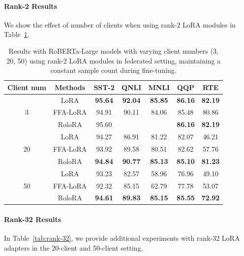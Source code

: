 \documentclass{article}
\theoremstyle{plain}
\theoremstyle{definition}
\theoremstyle{remark}
\begin{document}
\paragraph{Rank-2 Results}
We show the effect of number of clients when using rank-2 LoRA modules in Table~\ref{tab:Clients-num-appendix-rank-2}.
\begin{table}[h!]
\centering
    {\small\begin{tabular}{ccccccc}
    \toprule
        Client num& Methods  & SST-2 & QNLI & MNLI & QQP & RTE \\
        \midrule 
         &LoRA&\textbf{95.64}&\textbf{92.04}&\textbf{85.85}&\textbf{86.16}&\textbf{82.19}\\      
        3 &FFA-LoRA&94.91&90.11&84.06&85.48&80.86\\
         &\cellcolor{ours}RoloRA&\cellcolor{ours}95.60&\cellcolor{ours}{91.62}&\cellcolor{ours}{85.66}&\cellcolor{ours}\textbf{86.16}&\cellcolor{ours}\textbf{82.19}\\
         \midrule 
                 &LoRA&94.27&86.91&81.22&82.07&46.21\\
       20 &FFA-LoRA&93.92&89.58&80.51&82.62&57.76\\
         &\cellcolor{ours}RoloRA&\cellcolor{ours}\textbf{94.84}&\cellcolor{ours}\textbf{90.77}&\cellcolor{ours}\textbf{85.13}&\cellcolor{ours}\textbf{85.10}&\cellcolor{ours}\textbf{81.23}\\
         \midrule 
                 &LoRA&93.23&82.57&58.96&76.96&49.10\\
        50 &FFA-LoRA&92.32&85.15&62.79&77.78&53.07\\
         &\cellcolor{ours}RoloRA&\cellcolor{ours}\textbf{94.61}&\cellcolor{ours}\textbf{89.83}&\cellcolor{ours}\textbf{85.15}&\cellcolor{ours}\textbf{85.55}&\cellcolor{ours}\textbf{72.92} \\
         \bottomrule
    \end{tabular}
    \vspace{4pt}
        \caption{Results with RoBERTa-Large models with varying client numbers (3, 20, 50) using rank-2 LoRA modules in federated setting, maintaining a constant sample count during fine-tuning.
        \label{tab:Clients-num-appendix-rank-2}}
}
\end{table}



\paragraph{Rank-32 Results}
In Table~\ref{tab:rank-32}, we provide additional experiments with rank-32 LoRA adapters in the 20-client and 50-client setting.
\end{document}
